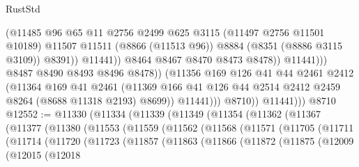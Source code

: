 \begin{lexlean}{RustStd}
\begin{coremodule}
                                      (@11485
                                        @96
                                        @65
                                        @11
                                        @2756
                                        @2499
                                        @625
                                        @3115
                                        (@11497 @2756 @11501 @10189)
                                        @11507
                                        @11511
                                        (@8866 (@11513 @96))
                                        @8884
                                        (@8351 (@8886 @3115 @3109))
                                        @8391))
                                    @11441))
                                @8464
                                @8467
                                @8470
                                @8473
                                @8478))
                            @11441)))
                      @8487
                      @8490
                      @8493
                      @8496
                      @8478))
                  (@11356
                    @169
                    @126
                    @41
                    @44
                    @2461
                    @2412
                    (@11364
                      @169
                      @41
                      @2461
                      (@11369 @166 @41 @126 @44 @2514 @2412 @2459 @8264 (@8688 @11318 @2193) @8699))
                    @11441)))
              @8710))
          @11441)))
    @8710
@12552 := @11330
    (@11334
      (@11339
        (@11349
          (@11354
            (@11362
              (@11367
                (@11377
                  (@11380
                    (@11553
                      (@11559
                        (@11562
                          (@11568
                            (@11571
                              (@11705
                                (@11711
                                  (@11714
                                    (@11720
                                      (@11723
                                        (@11857
                                          (@11863
                                            (@11866
                                              (@11872
                                                (@11875
                                                  (@12009
                                                    (@12015
                                                      (@12018

\end{coremodule}
\end{lexlean}
